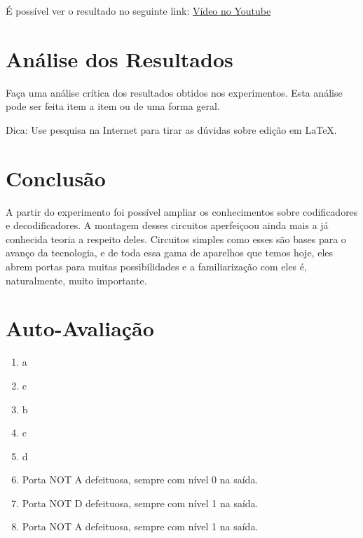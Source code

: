 \documentclass[12pt]{article}
\begin{document}
É possível ver o resultado no seguinte link: \href{https://www.youtube.com/watch?v=paRaiHqDqBo}{Vídeo no Youtube}


\section{Análise dos Resultados}
\label{sec:Resultados}

Faça uma análise crítica dos resultados obtidos nos experimentos. Esta análise pode ser feita item a item ou de uma forma geral.

Dica: Use pesquisa na Internet para tirar as dúvidas sobre edição em \LaTeX .

\section{Conclusão}
\label{sec:Conclusao}

A partir do experimento foi possível ampliar os conhecimentos sobre codificadores e decodificadores. A montagem desses circuitos aperfeiçoou ainda mais a já conhecida teoria a respeito deles. Circuitos simples como esses são bases para o avanço da tecnologia, e de toda essa gama de aparelhos que temos hoje, eles abrem portas para muitas possibilidades e a familiarização com eles é, naturalmente, muito importante.






\newpage 
\section*{Auto-Avaliação}

\begin{enumerate}
    \item a
    \item c
    \item b
    \item c
    \item d
    \item Porta NOT A defeituosa, sempre com nível 0 na saída.
    \item Porta NOT D defeituosa, sempre com nível 1 na saída. 
    \item Porta NOT A defeituosa, sempre com nível 1 na saída.
\end{enumerate}
\end{document}
